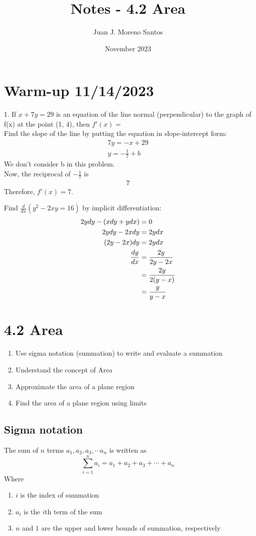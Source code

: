 \documentclass[11pt]{article}
\newcommand*{\vs}{\vspace{1cm}}
\newcommand*{\next}{\noindent}
\newcommand*{\set}{\setcounter{equation}{0}}
\begin{document}
\title{Notes - 4.2 Area}
\author{Juan J. Moreno Santos}
\date{November 2023}

\maketitle

\section{Warm-up 11/14/2023}
1. If $x+7y=29$ is an equation of the line normal (perpendicular) to the graph of f(x) at the point (1, 4), then $f'(x)=$\\
Find the slope of the line by putting the equation in slope-intercept form:
\begin{align}
    7y=-x+29\\
    y=-\frac{1}{7}+b
\end{align}
We don't consider b in this problem.\\
Now, the reciprocal of $-\frac{1}{7}$ is
\begin{align}
    7
\end{align}
Therefore, $f'(x)=7$.

\vs
\next
Find $\frac{d}{dx}(y^2-2xy=16)$ by implicit differentiation:
\begin{align}
    \set
    2ydy-(xdy+ydx)&=0\\
    2ydy-2xdy&=2ydx\\
    (2y-2x)dy&=2ydx\\
    \frac{dy}{dx}&=\frac{2y}{2y-2x}\\
    &=\frac{2y}{2(y-x)}\\
    &=\frac{y}{y-x}
\end{align}

\section{4.2 Area}
\begin{enumerate}
    \item Use sigma notation (summation) to write and evaluate a summation
    \item Understand the concept of Area
    \item Approximate the area of a plane region
    \item Find the area of a plane region using limits
\end{enumerate}

\subsection{Sigma notation}
The sum of $n$ terms $a_1, a_2, a_3,\cdots a_n$ is written as
\[\sum_{i=1}^{n}a_i=a_1+a_2+a_3+\cdots+a_n\]
Where 
\begin{enumerate}
    \item $i$ is the index of summation
    \item $a_i$ is the $i$th term of the sum
    \item $n$ and $1$ are the upper and lower bounds of summation, respectively
\end{enumerate}
\end{document}
